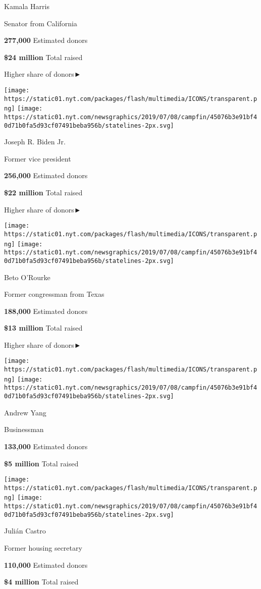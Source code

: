 Kamala Harris

Senator from California

\textbf{277,000} Estimated donors

\textbf{\$24 million} Total raised

Higher share of donors►

\texttt{[image: https://static01.nyt.com/packages/flash/multimedia/ICONS/transparent.png]}
\texttt{[image: https://static01.nyt.com/newsgraphics/2019/07/08/campfin/45076b3e91bf40d71b0fa5d93cf07491beba956b/statelines-2px.svg]}

Joseph R. Biden Jr.

Former vice president

\textbf{256,000} Estimated donors

\textbf{\$22 million} Total raised

Higher share of donors►

\texttt{[image: https://static01.nyt.com/packages/flash/multimedia/ICONS/transparent.png]}
\texttt{[image: https://static01.nyt.com/newsgraphics/2019/07/08/campfin/45076b3e91bf40d71b0fa5d93cf07491beba956b/statelines-2px.svg]}

Beto O'Rourke

Former congressman from Texas

\textbf{188,000} Estimated donors

\textbf{\$13 million} Total raised

Higher share of donors►

\texttt{[image: https://static01.nyt.com/packages/flash/multimedia/ICONS/transparent.png]}
\texttt{[image: https://static01.nyt.com/newsgraphics/2019/07/08/campfin/45076b3e91bf40d71b0fa5d93cf07491beba956b/statelines-2px.svg]}

Andrew Yang

Businessman

\textbf{133,000} Estimated donors

\textbf{\$5 million} Total raised

\texttt{[image: https://static01.nyt.com/packages/flash/multimedia/ICONS/transparent.png]}
\texttt{[image: https://static01.nyt.com/newsgraphics/2019/07/08/campfin/45076b3e91bf40d71b0fa5d93cf07491beba956b/statelines-2px.svg]}

Julián Castro

Former housing secretary

\textbf{110,000} Estimated donors

\textbf{\$4 million} Total raised

